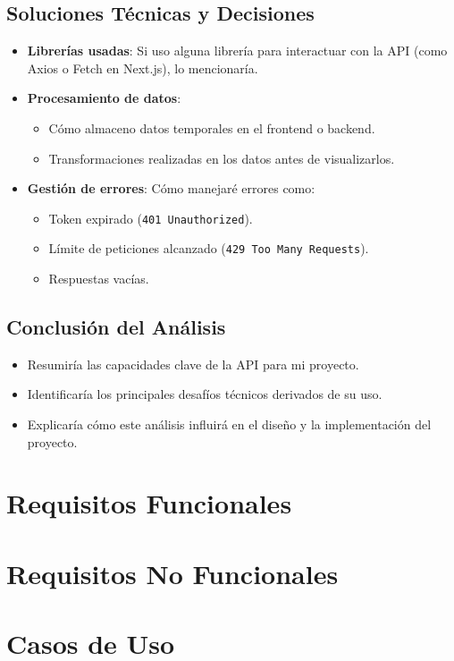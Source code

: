 \subsection{Soluciones Técnicas y Decisiones}
\begin{itemize}
    \item \textbf{Librerías usadas}: Si uso alguna librería para interactuar con la API (como Axios o Fetch en Next.js), lo mencionaría.
    \item \textbf{Procesamiento de datos}:
          \begin{itemize}
              \item Cómo almaceno datos temporales en el frontend o backend.
              \item Transformaciones realizadas en los datos antes de visualizarlos.
          \end{itemize}
    \item \textbf{Gestión de errores}: Cómo manejaré errores como:
          \begin{itemize}
              \item Token expirado (\texttt{401 Unauthorized}).
              \item Límite de peticiones alcanzado (\texttt{429 Too Many Requests}).
              \item Respuestas vacías.
          \end{itemize}
\end{itemize}

\subsection{Conclusión del Análisis}
\begin{itemize}
    \item Resumiría las capacidades clave de la API para mi proyecto.
    \item Identificaría los principales desafíos técnicos derivados de su uso.
    \item Explicaría cómo este análisis influirá en el diseño y la implementación del proyecto.
\end{itemize}




\section{Requisitos Funcionales}

\section{Requisitos No Funcionales}

\section{Casos de Uso}